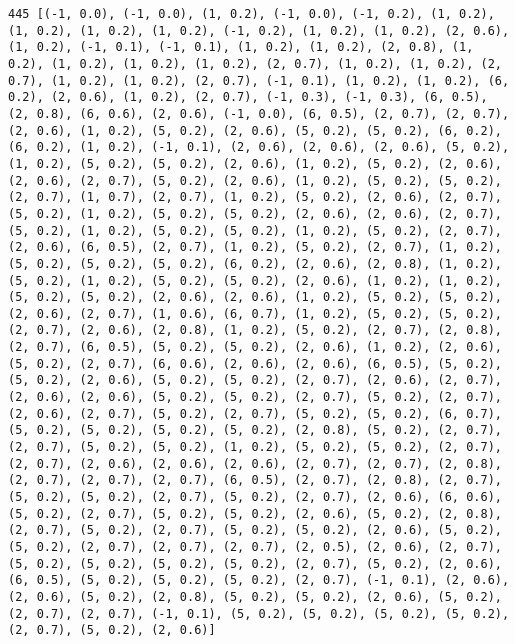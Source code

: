 \documentclass[11pt]{article}
\begin{document}
\begin{Verbatim}[commandchars=\\\{\}]
445 [(-1, 0.0), (-1, 0.0), (1, 0.2), (-1, 0.0), (-1, 0.2), (1, 0.2), (1, 0.2), (1, 0.2), (1, 0.2), (-1, 0.2), (1, 0.2), (1, 0.2), (2, 0.6), (1, 0.2), (-1, 0.1), (-1, 0.1), (1, 0.2), (1, 0.2), (2, 0.8), (1, 0.2), (1, 0.2), (1, 0.2), (1, 0.2), (2, 0.7), (1, 0.2), (1, 0.2), (2, 0.7), (1, 0.2), (1, 0.2), (2, 0.7), (-1, 0.1), (1, 0.2), (1, 0.2), (6, 0.2), (2, 0.6), (1, 0.2), (2, 0.7), (-1, 0.3), (-1, 0.3), (6, 0.5), (2, 0.8), (6, 0.6), (2, 0.6), (-1, 0.0), (6, 0.5), (2, 0.7), (2, 0.7), (2, 0.6), (1, 0.2), (5, 0.2), (2, 0.6), (5, 0.2), (5, 0.2), (6, 0.2), (6, 0.2), (1, 0.2), (-1, 0.1), (2, 0.6), (2, 0.6), (2, 0.6), (5, 0.2), (1, 0.2), (5, 0.2), (5, 0.2), (2, 0.6), (1, 0.2), (5, 0.2), (2, 0.6), (2, 0.6), (2, 0.7), (5, 0.2), (2, 0.6), (1, 0.2), (5, 0.2), (5, 0.2), (2, 0.7), (1, 0.7), (2, 0.7), (1, 0.2), (5, 0.2), (2, 0.6), (2, 0.7), (5, 0.2), (1, 0.2), (5, 0.2), (5, 0.2), (2, 0.6), (2, 0.6), (2, 0.7), (5, 0.2), (1, 0.2), (5, 0.2), (5, 0.2), (1, 0.2), (5, 0.2), (2, 0.7), (2, 0.6), (6, 0.5), (2, 0.7), (1, 0.2), (5, 0.2), (2, 0.7), (1, 0.2), (5, 0.2), (5, 0.2), (5, 0.2), (6, 0.2), (2, 0.6), (2, 0.8), (1, 0.2), (5, 0.2), (1, 0.2), (5, 0.2), (5, 0.2), (2, 0.6), (1, 0.2), (1, 0.2), (5, 0.2), (5, 0.2), (2, 0.6), (2, 0.6), (1, 0.2), (5, 0.2), (5, 0.2), (2, 0.6), (2, 0.7), (1, 0.6), (6, 0.7), (1, 0.2), (5, 0.2), (5, 0.2), (2, 0.7), (2, 0.6), (2, 0.8), (1, 0.2), (5, 0.2), (2, 0.7), (2, 0.8), (2, 0.7), (6, 0.5), (5, 0.2), (5, 0.2), (2, 0.6), (1, 0.2), (2, 0.6), (5, 0.2), (2, 0.7), (6, 0.6), (2, 0.6), (2, 0.6), (6, 0.5), (5, 0.2), (5, 0.2), (2, 0.6), (5, 0.2), (5, 0.2), (2, 0.7), (2, 0.6), (2, 0.7), (2, 0.6), (2, 0.6), (5, 0.2), (5, 0.2), (2, 0.7), (5, 0.2), (2, 0.7), (2, 0.6), (2, 0.7), (5, 0.2), (2, 0.7), (5, 0.2), (5, 0.2), (6, 0.7), (5, 0.2), (5, 0.2), (5, 0.2), (5, 0.2), (2, 0.8), (5, 0.2), (2, 0.7), (2, 0.7), (5, 0.2), (5, 0.2), (1, 0.2), (5, 0.2), (5, 0.2), (2, 0.7), (2, 0.7), (2, 0.6), (2, 0.6), (2, 0.6), (2, 0.7), (2, 0.7), (2, 0.8), (2, 0.7), (2, 0.7), (2, 0.7), (6, 0.5), (2, 0.7), (2, 0.8), (2, 0.7), (5, 0.2), (5, 0.2), (2, 0.7), (5, 0.2), (2, 0.7), (2, 0.6), (6, 0.6), (5, 0.2), (2, 0.7), (5, 0.2), (5, 0.2), (2, 0.6), (5, 0.2), (2, 0.8), (2, 0.7), (5, 0.2), (2, 0.7), (5, 0.2), (5, 0.2), (2, 0.6), (5, 0.2), (5, 0.2), (2, 0.7), (2, 0.7), (2, 0.7), (2, 0.5), (2, 0.6), (2, 0.7), (5, 0.2), (5, 0.2), (5, 0.2), (5, 0.2), (2, 0.7), (5, 0.2), (2, 0.6), (6, 0.5), (5, 0.2), (5, 0.2), (5, 0.2), (2, 0.7), (-1, 0.1), (2, 0.6), (2, 0.6), (5, 0.2), (2, 0.8), (5, 0.2), (5, 0.2), (2, 0.6), (5, 0.2), (2, 0.7), (2, 0.7), (-1, 0.1), (5, 0.2), (5, 0.2), (5, 0.2), (5, 0.2), (2, 0.7), (5, 0.2), (2, 0.6)]

\end{Verbatim}
\end{document}
